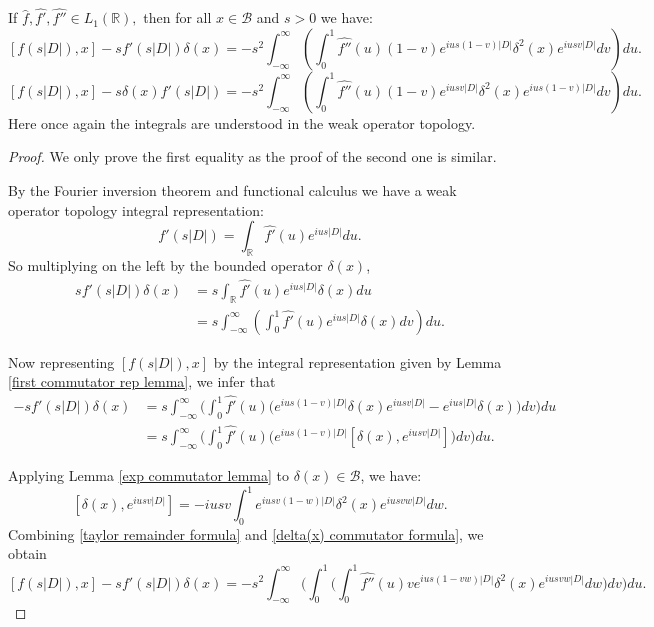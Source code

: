     
    \begin{lem}\label{second commutator rep lemma} 
        If $\widehat{f},\widehat{f'},\widehat{f''}\in L_1(\mathbb{R}),$ then for all $x \in \mathcal{B}$ and $s > 0$ we have:
        $$[f(s|D|),x]-sf'(s|D|)\delta(x) = -s^2\int_{-\infty}^{\infty}\left(\int_0^1\widehat{f''}(u)(1-v)e^{ius(1-v)|D|}\delta^2(x)e^{iusv|D|}dv\right)du.$$
        $$[f(s|D|),x]-s\delta(x)f'(s|D|) = -s^2\int_{-\infty}^{\infty}\left(\int_0^1\widehat{f''}(u)(1-v)e^{iusv|D|}\delta^2(x)e^{ius(1-v)|D|}dv\right)du.$$
        Here once again the integrals are understood in the weak operator topology.
    \end{lem}
    \begin{proof} We only prove the first equality as the proof of the second one is similar. 
    
        By the Fourier inversion theorem and functional calculus we have a weak operator topology integral representation:
        $$f'(s|D|)=\int_{\mathbb{R}}\widehat{f'}(u)e^{ius|D|}du.$$
        So multiplying on the left by the bounded operator $\delta(x)$,
        \begin{align*}
            sf'(s|D|)\delta(x)  &= s\int_{\mathbb{R}}\widehat{f'}(u)e^{ius|D|}\delta(x)du\\
                                &= s\int_{-\infty}^{\infty}\left(\int_0^1\widehat{f'}(u)e^{ius|D|}\delta(x)dv\right)du.
        \end{align*}

        Now representing $[f(s|D|),x]$ by the integral representation given by Lemma \ref{first commutator rep lemma}, we infer that
        \begin{align}
            [f(s|D|),x]-sf'(s|D|)\delta(x) &= s\int_{-\infty}^{\infty}\Big(\int_0^1\widehat{f'}(u)\Big(e^{ius(1-v)|D|}\delta(x)e^{iusv|D|}-e^{ius|D|}\delta(x)\Big)dv\Big)du\nonumber\\
                                           &= s\int_{-\infty}^{\infty}\Big(\int_0^1\widehat{f'}(u)\Big(e^{ius(1-v)|D|}[\delta(x),e^{iusv|D|}]\Big)dv\Big)du\label{taylor remainder formula}.
        \end{align}

        Applying Lemma \ref{exp commutator lemma} to $\delta(x) \in \mathcal{B}$, we have:
        \begin{equation}\label{delta(x) commutator formula}
            [\delta(x),e^{iusv|D|}] = -iusv\int_0^1e^{iusv(1-w)|D|}\delta^2(x)e^{iusvw|D|}dw.
        \end{equation}
        Combining \eqref{taylor remainder formula} and \eqref{delta(x) commutator formula}, we obtain
        \begin{equation}\label{taylor expansion triple integral}
            [f(s|D|),x]-sf'(s|D|)\delta(x) =-s^2\int_{-\infty}^{\infty}\Big(\int_0^1\Big(\int_0^1\widehat{f''}(u)ve^{ius(1-vw)|D|}\delta^2(x)e^{iusvw|D|}dw\Big)dv\Big)du.
        \end{equation}
        

\end{proof}
